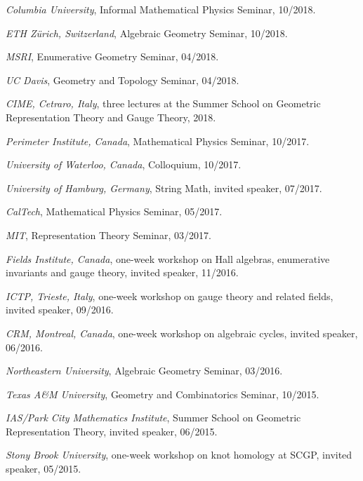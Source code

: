\documentclass[11pt]{article}
\begin{document}
\begin{cvlist}
  \item \emph{Columbia University}, Informal Mathematical Physics Seminar,
    10/2018.
  \item \emph{ETH Z\"urich, Switzerland}, Algebraic Geometry Seminar,
    10/2018.
  \item \emph{MSRI}, Enumerative Geometry Seminar, 04/2018.
  \item \emph{UC Davis}, Geometry and Topology Seminar, 04/2018.
  \item \emph{CIME, Cetraro, Italy}, three lectures at the Summer School on
    Geometric Representation Theory and Gauge Theory, 2018.
\end{cvlist}

\begin{cvlist}
  \item \emph{Perimeter Institute, Canada}, Mathematical Physics Seminar,
    10/2017.
  \item \emph{University of Waterloo, Canada}, Colloquium, 10/2017.
  \item \emph{University of Hamburg, Germany}, String Math, invited speaker,
    07/2017.
  \item \emph{CalTech}, Mathematical Physics Seminar, 05/2017.
  \item \emph{MIT}, Representation Theory Seminar, 03/2017.
\end{cvlist}

\begin{cvlist}
  \item \emph{Fields Institute, Canada}, one-week workshop on Hall algebras,
    enumerative invariants and gauge theory, invited speaker, 11/2016.
  \item \emph{ICTP, Trieste, Italy}, one-week workshop on gauge theory and
    related fields, invited speaker, 09/2016.
  \item \emph{CRM, Montreal, Canada}, one-week workshop on algebraic cycles,
    invited speaker, 06/2016.
  \item \emph{Northeastern University}, Algebraic Geometry Seminar, 03/2016.
\end{cvlist}

\begin{cvlist}
  \item \emph{Texas A\&M University}, Geometry and Combinatorics Seminar,
    10/2015.
  \item \emph{IAS/Park City Mathematics Institute}, Summer School on
    Geometric Representation Theory, invited speaker, 06/2015.
  \item \emph{Stony Brook University}, one-week workshop on knot homology at
    SCGP, invited speaker, 05/2015.
\end{cvlist}
\end{document}
